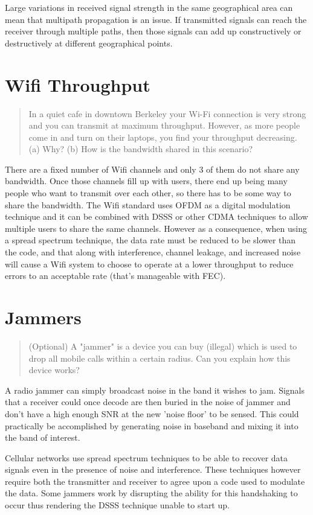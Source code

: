 \documentclass[11pt]{article}
\begin{document}
Large variations in received signal strength in the same geographical area can mean that multipath propagation is an issue. If transmitted signals can reach the receiver through multiple paths, then those signals can add up constructively or destructively at different geographical points.

\section{Wifi Throughput}
\begin{quote}
In a quiet cafe in downtown Berkeley your Wi-Fi connection is very strong and you can transmit at maximum throughput. However, as more people come in and turn on
their laptops, you find your throughput decreasing. (a) Why? (b) How is the bandwidth shared in this scenario?
\end{quote}

There are a fixed number of Wifi channels and only 3 of them do not share any bandwidth. Once those channels fill up with users, there end up being many people who want to transmit over each other, so there has to be some way to share the bandwidth. The Wifi standard uses OFDM as a digital modulation technique and it can be combined with DSSS or other CDMA techniques to allow multiple users to share the same channels. However as a consequence, when using a spread spectrum technique, the data rate must be reduced to be slower than the code, and that along with interference, channel leakage, and increased noise will cause a Wifi system to choose to operate at a lower throughput to reduce errors to an acceptable rate (that's manageable with FEC).

\section{Jammers}
\begin{quote}
	(Optional) A "jammer" is a device you can buy (illegal) which is used to drop all mobile calls within a certain radius. Can you explain how this device works?
\end{quote}

A radio jammer can simply broadcast noise in the band it wishes to jam. Signals that a receiver could once decode are then buried in the noise of jammer and don't have a high enough SNR at the new 'noise floor' to be sensed. This could practically be accomplished by generating noise in baseband and mixing it into the band of interest.

Cellular networks use spread spectrum techniques to be able to recover data signals even in the presence of noise and interference. These techniques however require both the transmitter and receiver to agree upon a code used to modulate the data. Some jammers work by disrupting the ability for this handshaking to occur thus rendering the DSSS technique unable to start up.
\end{document}
